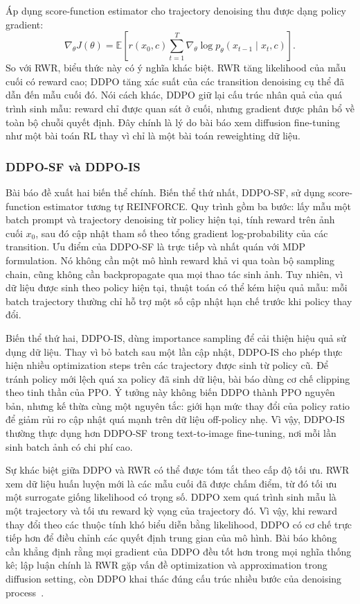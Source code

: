 Áp dụng score-function estimator cho trajectory denoising thu được dạng policy gradient:
\begin{equation}
    \nabla_\theta J(\theta)
    =
    \mathbb{E}
    \left[
        r(x_0,c)
        \sum_{t=1}^{T}
        \nabla_\theta
        \log p_\theta(x_{t-1}\mid x_t,c)
    \right].
\end{equation}
So với RWR, biểu thức này có ý nghĩa khác biệt.
RWR tăng likelihood của mẫu cuối có reward cao; DDPO tăng xác suất của các transition denoising cụ thể đã dẫn đến mẫu cuối đó.
Nói cách khác, DDPO giữ lại cấu trúc nhân quả của quá trình sinh mẫu: reward chỉ được quan sát ở cuối, nhưng gradient được phân bổ về toàn bộ chuỗi quyết định.
Đây chính là lý do bài báo xem diffusion fine-tuning như một bài toán RL thay vì chỉ là một bài toán reweighting dữ liệu.

\subsubsection*{DDPO-SF và DDPO-IS}

Bài báo đề xuất hai biến thể chính.
Biến thể thứ nhất, DDPO-SF, sử dụng score-function estimator tương tự REINFORCE.
Quy trình gồm ba bước: lấy mẫu một batch prompt và trajectory denoising từ policy hiện tại, tính reward trên ảnh cuối $x_0$, sau đó cập nhật tham số theo tổng gradient log-probability của các transition.
Ưu điểm của DDPO-SF là trực tiếp và nhất quán với MDP formulation.
Nó không cần một mô hình reward khả vi qua toàn bộ sampling chain, cũng không cần backpropagate qua mọi thao tác sinh ảnh.
Tuy nhiên, vì dữ liệu được sinh theo policy hiện tại, thuật toán có thể kém hiệu quả mẫu: mỗi batch trajectory thường chỉ hỗ trợ một số cập nhật hạn chế trước khi policy thay đổi.

Biến thể thứ hai, DDPO-IS, dùng importance sampling để cải thiện hiệu quả sử dụng dữ liệu.
Thay vì bỏ batch sau một lần cập nhật, DDPO-IS cho phép thực hiện nhiều optimization steps trên các trajectory được sinh từ policy cũ.
Để tránh policy mới lệch quá xa policy đã sinh dữ liệu, bài báo dùng cơ chế clipping theo tinh thần của PPO.
Ý tưởng này không biến DDPO thành PPO nguyên bản, nhưng kế thừa cùng một nguyên tắc: giới hạn mức thay đổi của policy ratio để giảm rủi ro cập nhật quá mạnh trên dữ liệu off-policy nhẹ.
Vì vậy, DDPO-IS thường thực dụng hơn DDPO-SF trong text-to-image fine-tuning, nơi mỗi lần sinh batch ảnh có chi phí cao.

Sự khác biệt giữa DDPO và RWR có thể được tóm tắt theo cấp độ tối ưu.
RWR xem dữ liệu huấn luyện mới là các mẫu cuối đã được chấm điểm, từ đó tối ưu một surrogate giống likelihood có trọng số.
DDPO xem quá trình sinh mẫu là một trajectory và tối ưu reward kỳ vọng của trajectory đó.
Vì vậy, khi reward thay đổi theo các thuộc tính khó biểu diễn bằng likelihood, DDPO có cơ chế trực tiếp hơn để điều chỉnh các quyết định trung gian của mô hình.
Bài báo không cần khẳng định rằng mọi gradient của DDPO đều tốt hơn trong mọi nghĩa thống kê; lập luận chính là RWR gặp vấn đề optimization và approximation trong diffusion setting, còn DDPO khai thác đúng cấu trúc nhiều bước của denoising process~\citep{black2024ddpo}.

